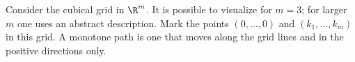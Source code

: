

\setcounter{section}{4}
\setcounter{subsection}{3}
\setcounter{dfn}{2}

Consider the cubical grid in $\R^m$.
It is possible to visualize for $m=3$; for larger $m$ one uses an abstract description.
Mark the points $(0, \ldots, 0)$ and $(k_1, \ldots, k_m)$ in this grid.
A monotone path is one that moves along the grid lines and in the positive directions only.



